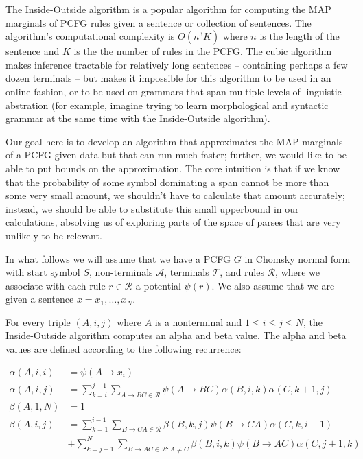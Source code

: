 \documentclass{article}
\author{Eyal Dechter}
\begin{document}
The Inside-Outside algorithm is a popular algorithm for computing the
MAP marginals of PCFG rules given a sentence or collection of
sentences. The algorithm's computational complexity is $O(n^3 K)$
where $n$ is the length of the sentence and $K$ is the the number of
rules in the PCFG. The cubic algorithm makes inference tractable for
relatively long sentences -- containing perhaps a few dozen terminals
-- but makes it impossible for this algorithm to be used in an online
fashion, or to be used on grammars that span multiple levels of
linguistic abstration (for example, imagine trying to learn
morphological and syntactic grammar at the same time with the
Inside-Outside algorithm). 

Our goal here is to develop an algorithm that approximates the MAP
marginals of a PCFG given data but that can run much faster; further,
we would like to be able to put bounds on the approximation. The core
intuition is that if we know that the probability of some symbol
dominating a span cannot be more than some very small amount, we
shouldn't have to calculate that amount accurately; instead, we should
be able to substitute this small upperbound in our calculations,
absolving us of exploring parts of the space of parses that are very
unlikely to be relevant.

In what follows we will assume that we have a PCFG $G$ in Chomsky
normal form with start symbol $S$, non-terminals $\mathcal{A}$,
terminals $\mathcal{T}$, and rules $\mathcal{R}$, where we associate
with each rule $r \in \mathcal{R}$ a potential $\psi(r)$. We also
assume that we are given a sentence $x = x_1, \dots, x_N$.

For every triple $(A, i, j)$ where $A$ is a nonterminal and $1 \leq i
\leq j \leq N$, the Inside-Outside algorithm computes an alpha and
beta value. The alpha and beta values are defined according to the
following recurrence:

\begin{align}
\alpha(A, i, i) &= \psi(A \rightarrow x_i)\\
\alpha(A, i, j) &= \sum_{k=i}^{j-1} \sum_{A \rightarrow B C \in \mathcal{R}}
  \psi(A \rightarrow B C ) \alpha(B, i, k) \alpha(C, k+1, j)\\
\beta(A, 1, N) &= 1 \\
\beta(A, i, j) &= \sum_{k=1}^{i-1} \sum_{B \rightarrow C A \in \mathcal{R}}
  \beta(B, k, j) \psi(B \rightarrow C A) \alpha(C, k, i-1)\\ 
  &+  \sum_{k=j+1}^{N} \sum_{B \rightarrow A C \in \mathcal{R} : A \neq C}
  \beta(B, i, k) \psi(B \rightarrow A C) \alpha(C, j+1, k) 
\end{align}
\end{document}
